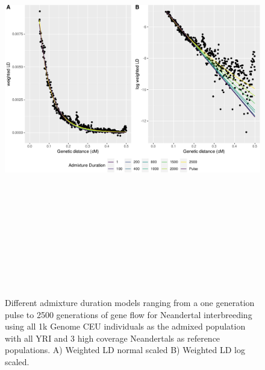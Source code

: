 \documentclass[]{article}
\begin{document}
\begin{figure}
\centering
\includegraphics[width=16cm,height=18cm,keepaspectratio]{Admixture_Time_Inference_Paper_Draft_files/figure-latex/fig5-1.pdf}
\caption{\label{fig:fig5} Different admixture duration models ranging
from a one generation pulse to 2500 generations of gene flow for Neandertal interbreeding using all 1k Genome CEU individuals as the admixed population
with all YRI and 3 high coverage Neandertals as reference populations. A) Weighted LD normal scaled B) Weighted LD log scaled.}
\end{figure}
\end{document}
